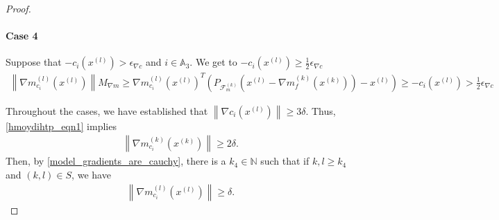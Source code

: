 \documentclass{article}
\theoremstyle{case}
\numberwithin{theorem}{subsection}
\newcommand{\feasiblek}{{\mathcal F_m^{(k)}}}
\newcommand{\gk}{{\nabla m_f^{(k)}\left(\xk\right)}}
\newcommand{\gmcik}{{\nabla m_{c_i}^{(k)}\left(\xk\right)}}
\newcommand{\gmcil}{{\nabla m_{c_i}^{(l)}\left(\xl\right)}}
\newcommand{\mingradepsilon}{{\epsilon_{\nabla c}}}
\newcommand{\naturals}{\mathbb N}
\newcommand{\xk}{x^{(k)}}
\newcommand{\xl}{{x^{(l)}}}
\newcommand{\maxmodelgrad}{{M_{\nabla m}}}
\begin{document}
\begin{proof}
\paragraph{Case 4}
Suppose that $-c_i\left(\xl\right) > \mingradepsilon$ and $i \in \mathbb A_3$.
\color{red}
We get to $-c_i\left(\xl\right) \ge \frac 1 2 \mingradepsilon$
\color{black}
\begin{align*}
\left\|\gmcil\right\| \maxmodelgrad
\ge \gmcil^T\left(P_{\feasiblek}\left(\xl - \gk\right) - \xl\right)
\ge -c_i\left(\xl\right) > \frac 1 2 \mingradepsilon
\end{align*}



Throughout the cases, we have established that $\left\| \nabla c_i\left(\xl\right) \right\| \ge 3 \delta$.
Thus, \cref{hmoydihtp_eqn1} implies 
\begin{align*}
\left\|\gmcik\right\| \ge 2 \delta.
\end{align*}
Then, by \cref{model_gradients_are_cauchy}, there is a $k_4 \in \naturals$ such that if $k, l \ge k_4$ and $(k,l) \in S$, we have
\begin{align*}
\left\|\gmcil\right\| \ge \delta.
\end{align*}
\end{proof}
\end{document}
